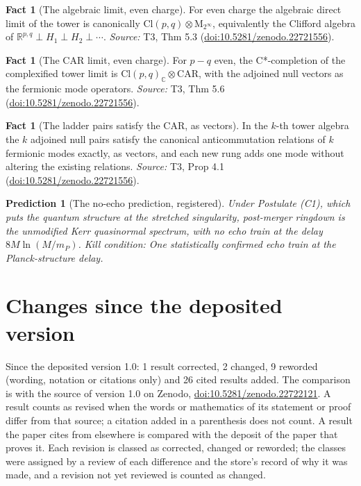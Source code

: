 \documentclass[11pt]{article}
\newtheorem{prediction}[theorem]{Prediction}
\theoremstyle{definition}
\newtheorem{fact}[theorem]{Fact}
\theoremstyle{plain}
\providecommand{\C}{}\renewcommand{\C}{\mathbb{C}}
\providecommand{\CAR}{}\renewcommand{\CAR}{\mathrm{CAR}}
\providecommand{\Cl}{}\renewcommand{\Cl}{\mathrm{Cl}}
\providecommand{\Mat}{}\renewcommand{\Mat}{\mathrm{M}}
\providecommand{\R}{}\renewcommand{\R}{\mathbb{R}}
\begin{document}
\begin{fact}[The algebraic limit, even charge]\label{c:tower.algebraic-limit-even-charge}
For even charge the algebraic direct limit of the tower is canonically $\Cl(p,q) \otimes \Mat_{2^\infty}$, equivalently the Clifford algebra of $\R^{p,q} \perp H_1 \perp H_2 \perp \cdots$.
\emph{Source:} T3, Thm 5.3 (\href{https://doi.org/10.5281/zenodo.22721556}{doi:10.5281/zenodo.22721556}).
\end{fact}

\begin{fact}[The CAR limit, even charge]\label{c:tower.car-limit-even-charge}
For $p - q$ even, the C*-completion of the complexified tower limit is $\Cl(p,q)_\C \otimes \CAR$, with the adjoined null vectors as the fermionic mode operators.
\emph{Source:} T3, Thm 5.6 (\href{https://doi.org/10.5281/zenodo.22721556}{doi:10.5281/zenodo.22721556}).
\end{fact}

\begin{fact}[The ladder pairs satisfy the CAR, as vectors]\label{c:tower.ladder-pairs-satisfy-car-vectors}
In the $k$-th tower algebra the $k$ adjoined null pairs satisfy the canonical anticommutation relations of $k$ fermionic modes exactly, as vectors, and each new rung adds one mode without altering the existing relations.
\emph{Source:} T3, Prop 4.1 (\href{https://doi.org/10.5281/zenodo.22721556}{doi:10.5281/zenodo.22721556}).
\end{fact}

\begin{prediction}[The no-echo prediction, registered]\label{c:scrambling.no-echo-prediction-registered}
Under Postulate (C1), which puts the quantum structure at the stretched singularity, post-merger ringdown is the unmodified Kerr quasinormal spectrum, with no echo train at the delay $8M\ln(M/m_P)$.
\emph{Kill condition:} One statistically confirmed echo train at the Planck-structure delay.
\end{prediction}

\section*{Changes since the deposited version}
Since the deposited version 1.0: 1 result corrected, 2 changed, 9 reworded (wording, notation or citations only) and 26 cited results added. The comparison is with the source of version 1.0 on Zenodo, \href{https://doi.org/10.5281/zenodo.22722121}{doi:10.5281/zenodo.22722121}. A result counts as revised when the words or mathematics of its statement or proof differ from that source; a citation added in a parenthesis does not count. A result the paper cites from elsewhere is compared with the deposit of the paper that proves it. Each revision is classed as corrected, changed or reworded; the classes were assigned by a review of each difference and the store's record of why it was made, and a revision not yet reviewed is counted as changed.
\end{document}

